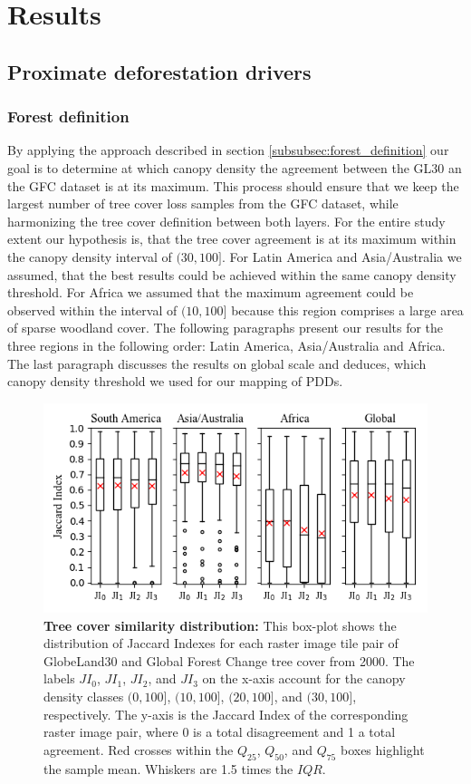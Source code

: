 \chapter{Results}
\label{ch:results}
	\section{Proximate deforestation drivers}
	\label{sec:results_deforestation}
		\subsection{Forest definition}
		\label{subsec:results_forest_definition}
			By applying the approach described in section \ref{subsubsec:forest_definition} our goal is to determine at which canopy density the agreement between the \ac{GL30} an the \ac{GFC} dataset is at its maximum. This process should ensure that we keep the largest number of tree cover loss samples from the \ac{GFC} dataset, while harmonizing the tree cover definition between both layers. For the entire study extent our hypothesis is, that the tree cover agreement is at its maximum within the canopy density interval of $(30,100]$. For Latin America and Asia/Australia we assumed, that the best results could be achieved within the same canopy density threshold. For Africa we assumed that the maximum agreement could be observed within the interval of $(10,100]$ because this region comprises a large area of sparse woodland cover. The following paragraphs present our results for the three regions in the following order: Latin America, Asia/Australia and Africa. The last paragraph discusses the results on global scale and deduces, which canopy density threshold we used for our mapping of \acp{PDD}.
			\begin{figure}[ht]
				\centering
				\includegraphics[scale=.91]{img/jaccard}
				\caption[Tree cover similarity distribution]{\textbf{Tree cover similarity distribution:} This box-plot shows the distribution of Jaccard Indexes for each raster image tile pair of GlobeLand30 and Global Forest Change tree cover from 2000. The labels $JI_0$, $JI_1$, $JI_2$, and $JI_3$ on the x-axis account for the canopy density classes $(0,100]$, $(10,100]$, $(20,100]$, and $(30,100]$, respectively. The y-axis is the Jaccard Index of the corresponding raster image pair, where 0 is a total disagreement and 1 a total agreement. Red crosses within the $Q_{25}$, $Q_{50}$, and $Q_{75}$ boxes highlight the sample mean. Whiskers are 1.5 times the $IQR$.}
				\label{fig:jaccard}
			\end{figure}

